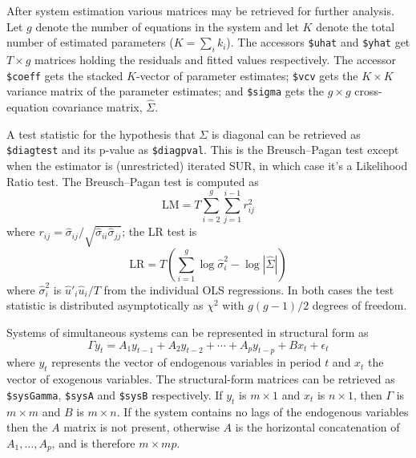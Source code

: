 After system estimation various matrices may be retrieved for further
analysis.  Let $g$ denote the number of equations in the system and
let $K$ denote the total number of estimated parameters ($K = \sum_i
k_i$). The accessors \verb|$uhat| and \verb|$yhat| get $T \times g$
matrices holding the residuals and fitted values respectively. The
accessor \verb|$coeff| gets the stacked $K$-vector of parameter
estimates; \verb|$vcv| gets the $K \times K$ variance matrix of the
parameter estimates; and \verb|$sigma| gets the $g \times g$
cross-equation covariance matrix, $\hat{\Sigma}$.

A test statistic for the hypothesis that $\Sigma$ is diagonal can be
retrieved as \verb|$diagtest| and its p-value as
\verb|$diagpval|. This is the Breusch--Pagan test except when the
estimator is (unrestricted) iterated SUR, in which case it's a
Likelihood Ratio test. The Breusch--Pagan test is computed as
\[
\mbox{LM} = T \sum_{i=2}^g \sum_{j=1}^{i-1} r^2_{ij}
\]
where $r_{ij} = \hat{\sigma}_{ij} /
\sqrt{\hat{\sigma}_{ii}\hat{\sigma}_{jj}}$; the LR test is
\[
\mbox{LR} = T \left(\sum_{i=1}^g \log \hat{\sigma}^2_i -\log 
 |\hat{\Sigma}| \right)
\]
where $\hat{\sigma}^2_i$ is $\hat{u}'_i \hat{u}_i / T$ from the
individual OLS regressions. In both cases the test statistic is
distributed asymptotically as $\chi^2$ with $g(g-1)/2$ degrees of
freedom. 

Systems of simultaneous systems can be represented in structural form
as
\[
\Gamma y_t = A_1 y_{t-1} + A_2 y_{t-2} + \cdots + A_p y_{t-p}
 + B x_t + \epsilon_t
\]
where $y_t$ represents the vector of endogenous variables in period
$t$ and $x_t$ the vector of exogenous variables.  The structural-form
matrices can be retrieved as \verb|$sysGamma|, \verb|$sysA| and
\verb|$sysB| respectively. If $y_t$ is $m \times 1$ and $x_t$ is $n
\times 1$, then $\Gamma$ is $m \times m$ and $B$ is $m \times n$. If
the system contains no lags of the endogenous variables then the $A$
matrix is not present, otherwise $A$ is the horizontal concatenation
of $A_1,\dots,A_p$, and is therefore $m \times mp$.


